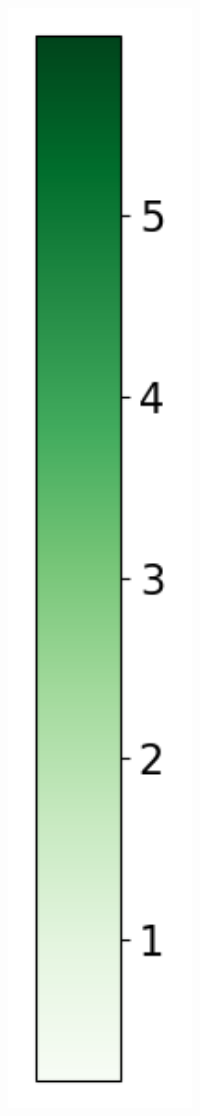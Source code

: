 \begin{figure}
\begin{subfigure}[b]{0.075\textwidth}
        \includegraphics[width=1\textwidth]{Results/kd-laplace/kd-Laplace/skewed-dataset/heatmap_legend_distance.png}
    \end{subfigure}
\end{figure}
\newpage
